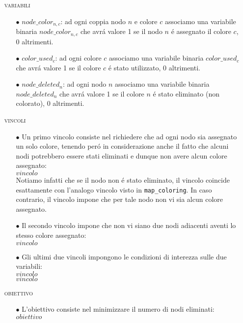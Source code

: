 \documentclass{article}
\begin{document}
\begin{itemize}
\item[] \textsc{variabili}
	\begin{itemize}
	\item[$\bullet$] $node\_color_{n,c}$: ad ogni coppia nodo $n$ e colore $c$ associamo una variabile binaria $node\_color_{n,c}$ che avr\'a valore 1 se il nodo $n$ \'e assegnato il colore $c$, 0 altrimenti.\\
	\item[$\bullet$] $color\_used_{c}$: ad ogni colore $c$ associamo una variabile binaria $color\_used_{c}$ che avr\'a valore 1 se il colore $c$ \'e stato utilizzato, 0 altrimenti.\\
	\item[$\bullet$] $node\_deleted_{n}$: ad ogni nodo $n$ associamo una variabile binaria $node\_deleted_{n}$ che avr\'a valore 1 se il colore $n$ \'e stato eliminato (non colorato), 0 altrimenti.\\
	\end{itemize}
	
\item[] \textsc{vincoli}
	\begin{itemize}
	\item[$\bullet$] Un primo vincolo consiste nel richiedere che ad ogni nodo sia assegnato un solo colore, tenendo per\'o in considerazione anche il fatto che alcuni nodi potrebbero essere stati eliminati e dunque non avere alcun colore assegnato:\\
	$vincolo$\\
	
	Notiamo infatti che se il nodo non \'e stato eliminato, il vincolo coincide esattamente con l'analogo vincolo visto in \texttt{map\_coloring}. In caso contrario, il vincolo impone che per tale nodo non vi sia alcun colore assegnato.\\
	
	\item[$\bullet$] Il secondo vincolo impone che non vi siano due nodi adiacenti aventi lo stesso colore assegnato:\\
	$vincolo$
	
	\item[$\bullet$] Gli ultimi due vincoli impongono le condizioni di interezza sulle due variabili:\\
	$vincolo$\\
	$vincolo$
	\end{itemize}


\item[] \textsc{obiettivo} 
	\begin{itemize}
	\item[$\bullet$] L'obiettivo consiste nel minimizzare il numero di nodi eliminati:\\
	$obiettivo$
	\end{itemize}
\end{itemize}
\end{document}

